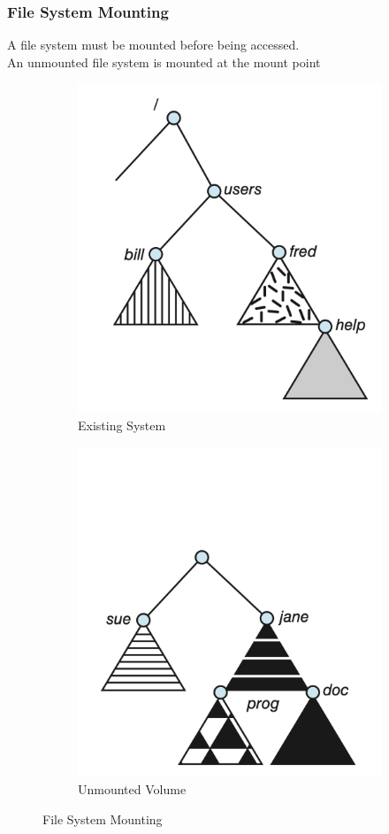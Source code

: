 \documentclass[oneside]{book}
\begin{document}
                    \subsubsection{File System Mounting}
                        A file system must be mounted before being accessed.\\
                        An unmounted file system is mounted at the mount point
                        \begin{figure}[H]
                            \centering
                            \begin{subfigure}{0.5\linewidth}
                                \centering
                                \includegraphics[width=0.6\linewidth]{figures/existing_system.png}
                                \caption{Existing System}
                            \end{subfigure}%
                            \begin{subfigure}{0.5\linewidth}
                                \centering
                                \includegraphics[width=0.6\linewidth]{figures/unmounted_volume.png}
                                \caption{Unmounted Volume}
                            \end{subfigure}
                            \caption{File System Mounting}
                        \end{figure}
\end{document}
